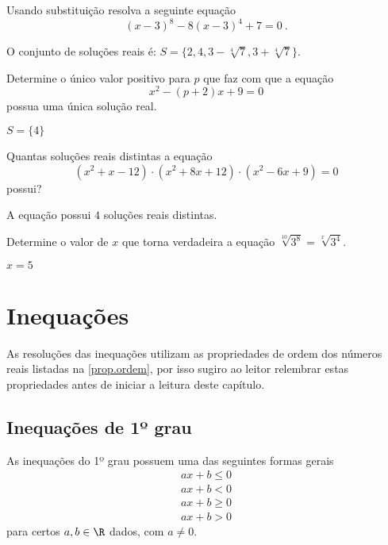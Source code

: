 \begin{exer}
Usando substituição resolva a seguinte equação \[(x-3)^8 - 8(x-3)^4 + 7=0 \ . \]
\end{exer}
\begin{resp}
O conjunto de soluções reais é:
 $S= \{2, 4, 3 - \sqrt[4]{7}, 3 + \sqrt[4]{7} \}$.
\end{resp}

\begin{exer}
Determine o único valor positivo para $p$ que faz com que a equação 
\[x^2 - (p+2)x + 9= 0\]
possua uma única solução real.
\end{exer}
\begin{resp}
 $S= \{4\}$
\end{resp}

\begin{exer}
Quantas soluções reais distintas a equação
\[(x^2 + x - 12)\cdot (x^2 + 8x + 12) \cdot (x^2 - 6x + 9)= 0\]
possui?
\end{exer}
\begin{resp}
  A equação possui $4$ soluções reais distintas.
\end{resp}

\begin{exer}
Determine o valor de $x$ que torna verdadeira a equação $\sqrt[10]{3^8}= \sqrt[x]{3^4}$.
\end{exer}
\begin{resp}
  $x= 5$
\end{resp}


\chapter{Inequações}

 As resoluções das inequações utilizam as propriedades de ordem dos números reais listadas na \autoref{prop.ordem}, por isso sugiro ao leitor relembrar estas propriedades antes de iniciar a leitura deste capítulo.

 \section{Inequações de 1º grau}
 
 \vskip0.3cm
 \colorbox{azul}{
 \begin{minipage}{0.9\linewidth}
 \begin{center}
  As inequações do 1º grau possuem uma das seguintes formas gerais
 \begin{eqnarray*}
 ax+b \leq 0 \\
 ax+b < 0 \\
 ax+b \geq 0 \\
 ax+b >0 
 \end{eqnarray*}  
 para certos $a, b \in \R$ dados, com $a \neq 0$.
 \end{center}
 \end{minipage}}
 \vskip0.3cm
  
